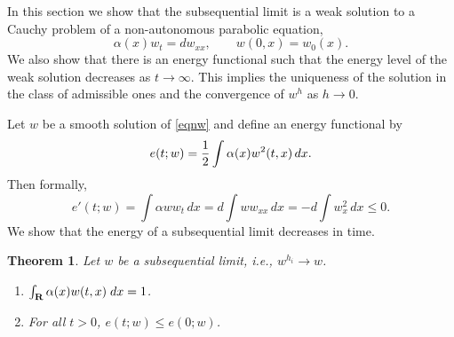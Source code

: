 \documentclass[11pt]{amsart}
\def\R{{\bf R}}
\def\R{\mathbb{R}}
\def\R{{\bf R}}
\newtheorem{theorem}{Theorem}[section]
\begin{document}
In this section we show that the subsequential limit is a weak solution to a
Cauchy problem of a non-autonomous parabolic equation,
\begin{equation}\label{eqnw}
  \alpha(x) w_t = d w_{xx},\qquad w(0,x)=w_0(x).
\end{equation}
We also show that there is an energy functional such that the energy level of the weak solution decreases as $t\to\infty$. This implies the uniqueness of the solution in the class of admissible ones and the convergence of $w^h$ as $h\to0$.

Let $w$ be a smooth solution of \eqref{eqnw} and define an energy
functional by
$$
e(t;w)={1\over 2}\int \alpha(x) w^2(t,x)\,dx.
$$
Then formally,
$$
e'(t;w)=\int \alpha ww_t\,dx=d\int ww_{xx}\,dx=-d\int w_x^2\,dx\le 0.
$$
We show that the energy of a subsequential limit decreases in time.
\begin{theorem}
Let $w$ be a subsequential limit, i.e., $w^{h_i}\to w$.
\begin{enumerate}
 \item  $\int_\R\alpha(x) w(t,x)\;dx = 1$.
 \item For all $t>0$, $e(t;w)\le e(0;w)$.
\end{enumerate}
\end{theorem}
\end{document}
